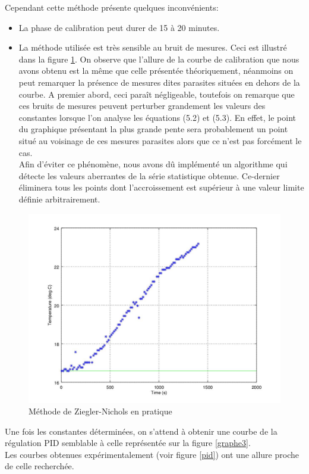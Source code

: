 \documentclass[12pt]{report}
\begin{document}
Cependant cette méthode présente quelques inconvénients:
\begin{itemize}
\item La phase de calibration peut durer de 15 à 20 minutes.
\item La méthode utilisée est très sensible au bruit de mesures. Ceci est illustré dans la figure \ref{graphe4}. On observe que l'allure de la courbe de calibration que nous avons obtenu est la même que celle présentée théoriquement, néanmoins on peut remarquer la présence de mesures dites parasites situées en dehors de la courbe. A premier abord, ceci paraît négligeable, toutefois on remarque que ces bruits de mesures peuvent perturber grandement les valeurs des constantes lorsque l'on analyse les équations (5.2) et (5.3). En effet, le point du graphique présentant la plus grande pente sera probablement un point situé au voisinage de ces mesures parasites alors que ce n'est pas forcément le cas.\\
Afin d'éviter ce phénomène, nous avons dû implémenté un algorithme qui détecte les valeurs aberrantes de la série statistique obtenue. Ce-dernier éliminera tous les points dont l'accroissement est supérieur à une valeur limite définie arbitrairement.
\end{itemize}

\begin{figure}
\begin{center}
\includegraphics[scale = 0.6]{vanne40.jpg}
\caption{\label{graphe4} Méthode de Ziegler-Nichols en pratique}
\end{center}
\end{figure}
\noindent
Une fois les constantes déterminées, on s'attend à obtenir une courbe de la régulation PID semblable à celle représentée sur la figure \ref{graphe3}.\\
Les courbes obtenues expérimentalement (voir figure \ref{pid}) ont une allure proche de celle recherchée.
\end{document}
